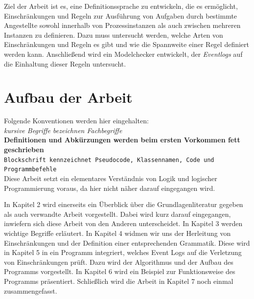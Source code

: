 Ziel der Arbeit ist es, eine Definitionssprache zu entwickeln, die es ermöglicht, Einschränkungen und Regeln zur Ausführung von Aufgaben durch bestimmte Angestellte sowohl innerhalb von Prozessinstanzen als auch zwischen mehreren Instanzen zu definieren. Dazu muss untersucht werden, welche Arten von Einschränkungen und Regeln es gibt und wie die Spannweite einer Regel definiert werden kann. Anschließend wird ein Modelchecker entwickelt, der \textit{Eventlogs} auf die Einhaltung dieser Regeln untersucht.




\section{Aufbau der Arbeit}
Folgende Konventionen werden hier eingehalten:\\
\textit{kursive Begriffe  bezeichnen Fachbegriffe}\\
\textbf{Definitionen und Abkürzungen werden beim ersten Vorkommen fett geschrieben}\\
\texttt{Blockschrift kennzeichnet Pseudocode, Klassennamen, Code und Programmbefehle}\\

Diese Arbeit setzt ein elementares Verständnis von Logik und logischer Programmierung voraus, da hier nicht näher darauf eingegangen wird.

In Kapitel 2 wird einerseits ein Überblick über die Grundlagenliteratur gegeben als auch verwandte Arbeit vorgestellt. Dabei wird kurz darauf eingegangen, inwiefern sich diese Arbeit von den Anderen unterscheidet. In Kapitel 3 werden wichtige Begriffe erläutert. In Kapitel 4 widmen wir uns der  Herleitung von Einschränkungen und der Definition einer entsprechenden Grammatik. Diese wird in Kapitel 5 in ein Programm integriert, welches Event Logs auf die Verletzung von Einschränkungen prüft. Dazu wird der Algorithmus und der Aufbau des Programms vorgestellt. In Kapitel 6 wird ein Beispiel zur Funktionsweise des Programms präsentiert. Schließlich wird die Arbeit in Kapitel 7 noch einmal zusammengefasst.

